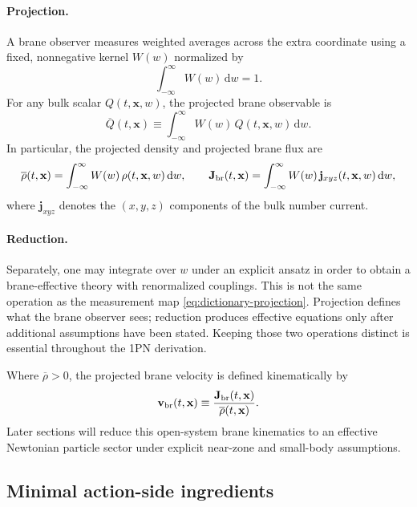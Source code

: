 \documentclass[11pt]{article}
\newcommand{\dd}{\mathrm d}
\newcommand{\x}{\mathbf x}
\newcommand{\Wproj}{W}
\newcommand{\Proj}[1]{\overline{#1}}
\begin{document}
\paragraph{Projection.}
A brane observer measures weighted averages across the extra coordinate using a fixed,
nonnegative kernel \(\Wproj(w)\) normalized by
\begin{equation}
\int_{-\infty}^{\infty}\Wproj(w)\,\dd w = 1.
\label{eq:dictionary-Wnorm}
\end{equation}
For any bulk scalar \(Q(t,\x,w)\), the projected brane observable is
\begin{equation}
\Proj{Q}(t,\x)
\equiv
\int_{-\infty}^{\infty}\Wproj(w)\,Q(t,\x,w)\,\dd w.
\label{eq:dictionary-projection}
\end{equation}
In particular, the projected density and projected brane flux are
\begin{equation}
\Proj{\rho}(t,\x)
=
\int_{-\infty}^{\infty}\Wproj(w)\,\rho(t,\x,w)\,\dd w,
\qquad
\mathbf{J}_{\rm br}(t,\x)
=
\int_{-\infty}^{\infty}\Wproj(w)\,\mathbf{j}_{xyz}(t,\x,w)\,\dd w,
\label{eq:dictionary-brane-observables}
\end{equation}
where \(\mathbf{j}_{xyz}\) denotes the \((x,y,z)\) components of the bulk number current.

\paragraph{Reduction.}
Separately, one may integrate over \(w\) under an explicit ansatz in order to obtain a
brane-effective theory with renormalized couplings. This is not the same operation as the
measurement map \eqref{eq:dictionary-projection}. Projection defines what the brane
observer sees; reduction produces effective equations only after additional assumptions
have been stated. Keeping those two operations distinct is essential throughout the 1PN
derivation.

Where \(\Proj{\rho}>0\), the projected brane velocity is defined kinematically by
\begin{equation}
\mathbf{v}_{\rm br}(t,\x)\equiv \frac{\mathbf{J}_{\rm br}(t,\x)}{\Proj{\rho}(t,\x)}.
\label{eq:dictionary-vbrane}
\end{equation}
Later sections will reduce this open-system brane kinematics to an effective Newtonian
particle sector under explicit near-zone and small-body assumptions.

\subsection{Minimal action-side ingredients}
\label{sec:dictionary-action}
\end{document}
